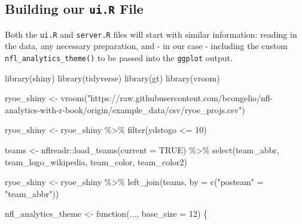 \documentclass[
  letterpaper,
]{krantz}
\newenvironment{Shaded}{\begin{snugshade}}{\end{snugshade}}
\newcommand{\AttributeTok}[1]{\textcolor[rgb]{0.40,0.45,0.13}{#1}}
\newcommand{\ConstantTok}[1]{\textcolor[rgb]{0.56,0.35,0.01}{#1}}
\newcommand{\ControlFlowTok}[1]{\textcolor[rgb]{0.00,0.23,0.31}{#1}}
\newcommand{\DecValTok}[1]{\textcolor[rgb]{0.68,0.00,0.00}{#1}}
\newcommand{\FunctionTok}[1]{\textcolor[rgb]{0.28,0.35,0.67}{#1}}
\newcommand{\NormalTok}[1]{\textcolor[rgb]{0.00,0.23,0.31}{#1}}
\newcommand{\OtherTok}[1]{\textcolor[rgb]{0.00,0.23,0.31}{#1}}
\newcommand{\SpecialCharTok}[1]{\textcolor[rgb]{0.37,0.37,0.37}{#1}}
\newcommand{\StringTok}[1]{\textcolor[rgb]{0.13,0.47,0.30}{#1}}
\begin{document}
\hypertarget{building-our-ui.r-file}{%
\subsection{\texorpdfstring{Building our \texttt{ui.R}
File}{Building our ui.R File}}\label{building-our-ui.r-file}}

Both the \texttt{ui.R} and \texttt{server.R} files will start with
similar information: reading in the data, any necessary preparation, and
- in our case - including the custom \texttt{nfl\_analytics\_theme()} to
be passed into the \texttt{ggplot} output.

\begin{Shaded}
\begin{Highlighting}[]
\FunctionTok{library}\NormalTok{(shiny)}
\FunctionTok{library}\NormalTok{(tidyverse)}
\FunctionTok{library}\NormalTok{(gt)}
\FunctionTok{library}\NormalTok{(vroom)}

\NormalTok{ryoe\_shiny }\OtherTok{\textless{}{-}}
  \FunctionTok{vroom}\NormalTok{(}\StringTok{"https://raw.githubusercontent.com/bcongelio/nfl{-}analytics{-}with{-}r{-}book/origin/example\_data/csv/ryoe\_projs.csv"}\NormalTok{)}

\NormalTok{ryoe\_shiny }\OtherTok{\textless{}{-}}\NormalTok{ ryoe\_shiny }\SpecialCharTok{\%\textgreater{}\%}
  \FunctionTok{filter}\NormalTok{(ydstogo }\SpecialCharTok{\textless{}=} \DecValTok{10}\NormalTok{)}

\NormalTok{teams }\OtherTok{\textless{}{-}}\NormalTok{ nflreadr}\SpecialCharTok{::}\FunctionTok{load\_teams}\NormalTok{(}\AttributeTok{current =} \ConstantTok{TRUE}\NormalTok{) }\SpecialCharTok{\%\textgreater{}\%}
  \FunctionTok{select}\NormalTok{(team\_abbr, team\_logo\_wikipedia, team\_color, team\_color2)}

\NormalTok{ryoe\_shiny }\OtherTok{\textless{}{-}}\NormalTok{ ryoe\_shiny }\SpecialCharTok{\%\textgreater{}\%}
  \FunctionTok{left\_join}\NormalTok{(teams, }\AttributeTok{by =} \FunctionTok{c}\NormalTok{(}\StringTok{"posteam"} \OtherTok{=} \StringTok{"team\_abbr"}\NormalTok{))}

\NormalTok{nfl\_analytics\_theme }\OtherTok{\textless{}{-}} \ControlFlowTok{function}\NormalTok{(..., }\AttributeTok{base\_size =} \DecValTok{12}\NormalTok{) \{}
  

\end{Highlighting}
\end{Shaded}
\end{document}
